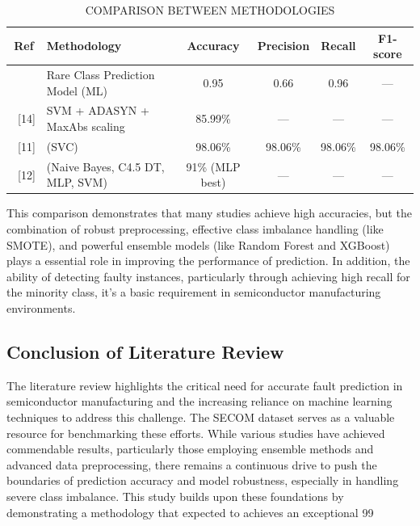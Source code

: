 \documentclass[12pt,oneside]{article}
\begin{document}
\begin{table}[ht]
\centering
\renewcommand{\arraystretch}{1.5} %
\caption{COMPARISON BETWEEN METHODOLOGIES}
\label{tab:comparison}
\vspace{0.3cm}
\begin{tabular}{c p{5.5cm} c c c c} %
\hline
\textbf{Ref} & \textbf{Methodology} & \textbf{Accuracy} & \textbf{Precision} & \textbf{Recall} & \textbf{F1-score} \\ \hline \hline
[1]  & Rare Class Prediction Model (ML) & 0.95 & 0.66 & 0.96 & --- \\ \
[14] & SVM + ADASYN + MaxAbs scaling & 85.99\% & --- & --- & --- \\ \
[11] & (SVC) & 98.06\% & 98.06\% & 98.06\% & 98.06\% \\ \
[12] & (Naive Bayes, C4.5 DT, MLP, SVM) & 91\% (MLP best) & --- & --- & --- \\ \hline
\end{tabular}
\end{table}
This comparison demonstrates that many studies achieve high accuracies, but the combination of robust preprocessing, effective class imbalance handling (like SMOTE), and powerful ensemble models (like Random Forest and XGBoost) plays a essential role in improving the performance of prediction. In addition, the ability of detecting faulty instances, particularly through achieving high recall for the minority class, it’s a basic requirement in semiconductor manufacturing environments.
\subsection{Conclusion of Literature Review}
The literature review highlights the critical need for accurate fault prediction in semiconductor manufacturing and the increasing reliance on machine learning techniques to address this challenge. The SECOM dataset serves as a valuable resource for benchmarking these efforts. While various studies have achieved commendable results, particularly those employing ensemble methods and advanced data preprocessing, there remains a continuous drive to push the boundaries of prediction accuracy and model robustness, especially in handling severe class imbalance. This study builds upon these foundations by demonstrating a methodology that expected to achieves an exceptional 99%
\end{document}

